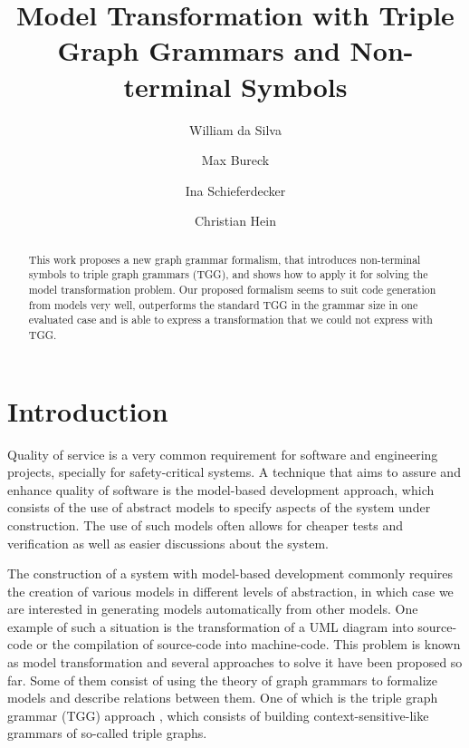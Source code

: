 \documentclass[runningheads]{llncs}
\begin{document}
%
\title{Model Transformation with Triple Graph Grammars and Non-terminal Symbols}
%
%
\author{William {da Silva} \and
Max {Bureck} \and
Ina {Schieferdecker} \and
Christian {Hein}}
%
%
%
\maketitle              %
%
\begin{abstract}
This work proposes a new graph grammar formalism, that introduces non-terminal symbols to triple graph grammars (TGG), and shows how to apply it for solving the model transformation problem. Our proposed formalism seems to suit code generation from models very well, outperforms the standard TGG in the grammar size in one evaluated case and is able to express a transformation that we could not express with TGG.

\end{abstract}
%
%
%
\section{Introduction}
Quality of service is a very common requirement for software and engineering projects, specially for safety-critical systems. A technique that aims to assure and enhance quality of software is the model-based development approach, which consists of the use of abstract models to specify aspects of the system under construction. The use of such models often allows for cheaper tests and verification as well as easier discussions about the system. 

The construction of a system with model-based development commonly requires the creation of various models in different levels of abstraction, in which case we are interested in generating models automatically from other models. One example of such a situation is the transformation of a UML diagram into source-code or the compilation of source-code into machine-code. This problem is known as model transformation and several approaches to solve it have been proposed so far. Some of them consist of using the theory of graph grammars to formalize models and describe relations between them. One of which is the triple graph grammar (TGG) approach \cite{schurr1994specification}, which consists of building context-sensitive-like grammars of so-called triple graphs.
\end{document}
